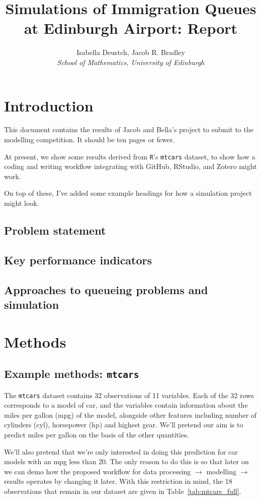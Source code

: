 \documentclass[12pt]{article}
\title{Simulations of Immigration Queues at Edinburgh Airport: Report}
\author{Isabella Deustch, Jacob R. Bradley
 \\ \emph{School of Mathematics, University of Edinburgh}}
\begin{document}
\maketitle

\section{Introduction}
This document contains the results of Jacob and Bella's project to submit to the modelling competition. It should be ten pages or fewer.  


At present, we show some results derived from \texttt{R}'s \texttt{mtcars} dataset, to show how a coding and writing workflow integrating with GitHub, RStudio, and Zotero might work.

On top of these, I've added some example headings for how a simulation project might look.

\subsection{Problem statement}
\subsection{Key performance indicators}
\subsection{Approaches to queueing problems and simulation}


\section{Methods}
\subsection{Example methods: \texttt{mtcars}}
The \texttt{mtcars} dataset contains 32 observations of 11 variables. Each of the 32 rows corresponds to a model of car, and the variables contain information about the miles per gallon (mpg) of the model, alongside other features including number of cylinders (cyl), horsepower (hp) and highest gear. We'll pretend our aim is to predict miles per gallon on the basis of the other quantities.

We'll also pretend that we're only interested in doing this prediction for car models with an mpg less than 20. The only reason to do this is so that later on we can demo how the proposed workflow for data processing $\rightarrow$ modelling $\rightarrow$ results operates by changing it later. With this restriction in mind, the 18 observations that remain in our dataset are given in Table~\ref{tab:mtcars_full}.
\end{document}
